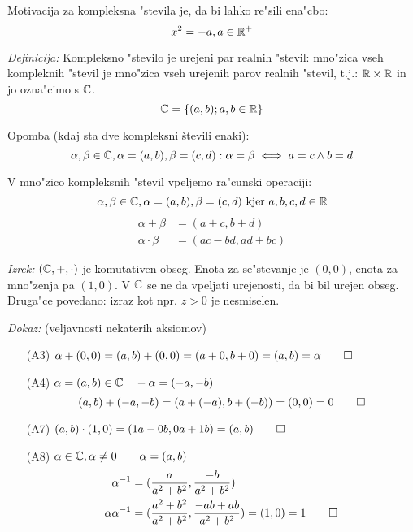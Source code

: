 Motivacija za kompleksna "stevila je, da bi lahko re"sili ena"cbo:
\begin{equation*}
x^2 = -a, a \in \mathbb{R}^+
\end{equation*}

\emph{Definicija:} Kompleksno "stevilo je urejeni par realnih "stevil: mno"zica vseh kompleknih "stevil je mno"zica vseh urejenih parov realnih "stevil, t.j.: $\mathbb{R} \times \mathbb{R}$ in jo ozna"cimo s $\mathbb{C}$.
\begin{equation*}
\mathbb{C} = \{(a, b); a, b \in \mathbb{R} \}
\end{equation*}

Opomba (kdaj sta dve kompleksni števili enaki):
\begin{equation*}
\alpha, \beta \in \mathbb{C}, \alpha = (a, b), \beta = (c, d): \alpha = \beta \iff a = c \land b = d
\end{equation*}

V mno"zico kompleksnih "stevil vpeljemo ra"cunski operaciji:
\begin{equation*}
\alpha, \beta \in \mathbb{C}, \alpha = (a, b), \beta = (c, d) \text{ kjer } a, b, c, d \in \mathbb{R}
\end{equation*}
\begin{align*}
\alpha + \beta &= (a + c, b + d)\\
\alpha \cdot \beta &= (ac - bd, ad + bc)
\end{align*}

\emph{Izrek:} $(\mathbb{C}, +, \cdot)$ je komutativen obseg. Enota za se"stevanje je $(0, 0)$, enota za mno"zenja pa $(1, 0)$. V $\mathbb{C}$ se ne da vpeljati urejenosti, da bi bil urejen obseg. Druga"ce povedano: izraz kot npr. $z > 0$ je nesmiselen.

\emph{Dokaz:} (veljavnosti nekaterih aksiomov)
\begin{itemize}
	\item[(A3)] $\alpha + (0, 0) = (a, b) + (0, 0) = (a + 0, b + 0) = (a, b) = \alpha \qed$
	\item[(A4)] $\alpha = (a, b) \in \mathbb{C} \quad -\alpha = (-a, -b)$
	\begin{equation*}
	(a, b) + (-a, -b) = (a + (-a), b + (-b)) = (0, 0) = 0 \qed
	\end{equation*}
	
	\item[(A7)] $(a, b) \cdot (1, 0) = (1a - 0b, 0a + 1b) = (a, b) \qed$
	\item[(A8)] $\alpha \in \mathbb{C}, \alpha \neq 0 \qquad \alpha = (a, b)$
	\begin{align*}
	\alpha^{-1} &= (\dfrac{a}{a^2 + b^2}, \dfrac{-b}{a^2 + b^2})\\
	\alpha \alpha^{-1} &= (\dfrac{a^2 + b^2}{a^2 + b^2}, \dfrac{-ab + ab}{a^2 + b^2}) = (1, 0) = 1 \qed
	\end{align*}
\end{itemize}

